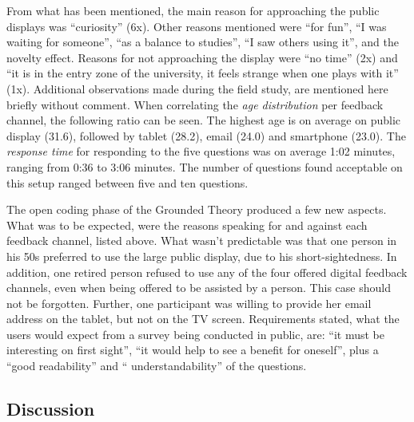 	From what has been mentioned, the main reason for approaching the public displays was ``curiosity'' (6x). Other reasons mentioned were ``for fun'', ``I was waiting for someone'', ``as a balance to studies'', ``I saw others using it'', and the novelty effect. Reasons for not approaching the display were ``no time'' (2x) and ``it is in the entry zone of the university, it feels strange when one plays with it'' (1x).
	Additional observations made during the field study, are mentioned here briefly without comment.
	When correlating the \textit{age distribution} per feedback channel, the following ratio can be seen. The highest age is on average on public display (31.6), followed by tablet (28.2), email (24.0) and smartphone (23.0).
	The \textit{response time} for responding to the five questions was on average 1:02 minutes, ranging from 0:36 to 3:06 minutes.
	The number of questions found acceptable on this setup ranged between five and ten questions.
	
	The open coding phase of the Grounded Theory produced a few new aspects. What was to be expected, were the reasons speaking for and against each feedback channel, listed above. What wasn't predictable was that one person in his 50s preferred to use the large public display, due to his short-sightedness. In addition, one retired person refused to use any of the four offered digital feedback channels, even when being offered to be assisted by a person. This case should not be forgotten. Further, one participant was willing to provide her email address on the tablet, but not on the TV screen.
	Requirements stated, what the users would expect from a survey being conducted in public, are: ``it must be interesting on first sight'', ``it would help to see a benefit for oneself'', plus a ``good readability'' and `` understandability'' of the questions.

	








\subsection{Discussion}



